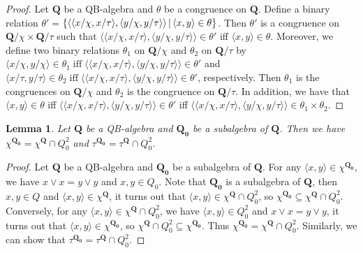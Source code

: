\documentclass[12pt]{amsart}
\newtheorem{lemma}{Lemma}[section]
\theoremstyle{definition}
\theoremstyle{remark}
\numberwithin{equation}{section}
\begin{document}
\begin{proof}
Let $\mathbf{Q}$ be a QB-algebra and $\theta$ be a congruence on $\mathbf{Q}$. Define a binary relation $\theta'=$$\{\langle \langle x/\chi , x/\tau\rangle, \\ \langle y/\chi , y/\tau\rangle \rangle \,|\, \langle x,y \rangle \in \theta \}$. Then $\theta'$ is a congruence on $\mathbf{Q}/\chi \times \mathbf{Q}/\tau$ such that $\langle \langle x/\chi , x/\tau\rangle, \langle y/\chi , y/\tau\rangle \rangle \in \theta'$ iff $\langle x,y\rangle \in \theta$. Moreover, we define two binary relations $\theta_{1}$ on $\mathbf{Q}/\chi$ and $\theta_{2}$ on $\mathbf{Q}/\tau$ by $\langle x/ \chi , y/ \chi \rangle \in \theta_{1}\;\mathrm{iff}\; \langle \langle x/ \chi,x/\tau \rangle , \langle y/ \chi,y/\tau \rangle \rangle \in \theta'$ and $\langle x/ \tau , y/ \tau \rangle \in \theta_{2} \;\mathrm{iff}\; \langle \langle x/ \chi,x/\tau \rangle , \langle y/ \chi,y/\tau \rangle \rangle\in \theta'$, respectively. Then $\theta_{1}$ is the congruences on $\mathbf{Q}/\chi$ and  $\theta_{2}$ is the congruence on $\mathbf{Q}/\tau$. In addition, we have that $\langle x,y \rangle \in \theta$ iff $\langle \langle x/ \chi,x/\tau \rangle , \langle y/ \chi,y/\tau \rangle \rangle \in \theta'$ iff $\langle \langle x/\chi ,x/\tau \rangle,  \langle y/\chi ,y/\tau \rangle \rangle \in \theta_{1} \times \theta_{2}$.
\end{proof}

\begin{lemma}\label{Lemma 7}
Let $\mathbf{Q}$ be a QB-algebra and $\mathbf{Q_{0}}$ be a subalgebra of $\mathbf{Q}$. Then we have $\chi ^{\mathbf{Q_{0}}}=\chi ^{\mathbf{Q}} \cap Q_{0}^{2}$ and $\tau ^{\mathbf{Q_{0}}}=\tau ^{\mathbf{Q}} \cap Q_{0}^{2}$.
\end{lemma}

\begin{proof}
Let $\mathbf{Q}$ be a QB-algebra and $\mathbf{Q_{0}}$ be a subalgebra of $\mathbf{Q}$. For any $\langle x,y\rangle \in \chi^{\mathbf{Q_{0}}}$, we have $x\vee x=y\vee y$ and $x,y \in Q_{0}$. Note that $\mathbf{Q_{0}}$ is a subalgebra of $\mathbf{Q}$, then $x,y \in Q$ and $\langle x,y\rangle \in \chi^{\mathbf{Q}}$, it turns out that $\langle x,y\rangle \in \chi^{\mathbf{Q}} \cap Q_{0}^{2}$, so $\chi^{\mathbf{Q_{0}}}\subseteq \chi^{\mathbf{Q}}\cap Q_{0}^{2}$. Conversely, for any $\langle x,y\rangle \in \chi^{\mathbf{Q}} \cap Q_{0}^{2}$, we have $\langle x,y \rangle \in Q_{0}^{2}$ and $x\vee x=y\vee y$, it turns out that $\langle x,y\rangle \in \chi^{\mathbf{Q_{0}}}$, so $\chi^{\mathbf{Q}}\cap Q_{0}^{2}\subseteq \chi^{\mathbf{Q_{0}}}$. Thus $\chi^{\mathbf{Q_{0}}}=\chi^{\mathbf{Q}}\cap Q_{0}^{2}$. Similarly, we can show that $\tau^{\mathbf{Q_{0}}}=\tau^{\mathbf{Q}}\cap Q_{0}^{2}$.
\end{proof}
\end{document}
